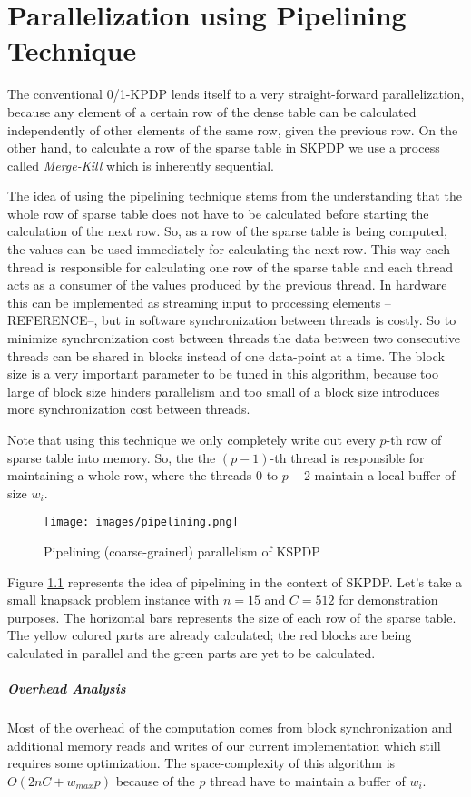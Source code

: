 \chapter{Parallelization using Pipelining Technique}
\label{chap:pipeline}

The conventional 0/1-KPDP lends itself to a very straight-forward parallelization, because any element of a certain row of the dense table can be calculated independently of other elements of the same row, given the previous row. On the other hand, to calculate a row of the sparse table in SKPDP we use a process called \textit{Merge-Kill} which is inherently sequential.

The idea of using the pipelining technique stems from the understanding that the whole row of sparse table does not have to be calculated before starting the calculation of the next row. So, as a row of the sparse table is being computed, the values can be used immediately for calculating the next row. This way each thread is responsible for calculating one row of the sparse table and each thread acts as a consumer of the values produced by the previous thread. In hardware this can be implemented as streaming input to processing elements --REFERENCE--, but in software synchronization between threads is costly. So to minimize synchronization cost between threads the data between two consecutive threads can be shared in blocks instead of one data-point at a time. The block size is a very important parameter to be tuned in this algorithm, because too large of block size hinders parallelism and too small of a block size introduces more synchronization cost between threads.

Note that using this technique we only completely write out every $p$-th row of sparse table into memory. So, the the $(p-1)$-th thread is responsible for maintaining a whole row, where the threads 0 to $p-2$ maintain a local buffer of size $w_i$. 


\begin{figure}[htbp]
\centerline{\texttt{[image: images/pipelining.png]}}
\caption{Pipelining (coarse-grained) parallelism of KSPDP }
\label{fig:pipeline}
\end{figure}

Figure \ref{fig:pipeline} represents the idea of pipelining in the context of SKPDP. Let's take a small knapsack problem instance with $n=15$ and $C=512$ for demonstration purposes. The horizontal bars represents the size of each row of the sparse table. The yellow colored parts are already calculated; the red blocks are being calculated in parallel and the green parts are yet to be calculated.

\paragraph{Overhead Analysis} Most of the overhead of the computation comes from block synchronization and additional memory reads and writes of our current implementation which still requires some optimization. The space-complexity of this algorithm is $O(2nC + w_{max}p)$ because of the $p$ thread have to maintain a buffer of $w_i$.